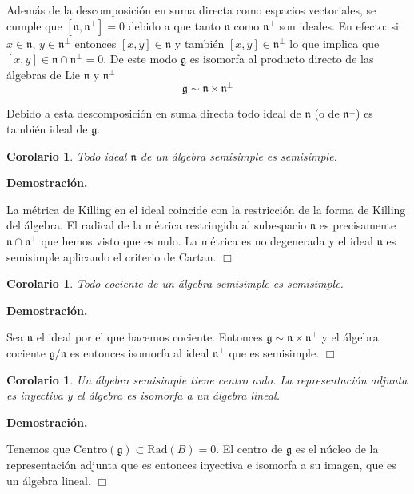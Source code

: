 \documentclass[a4paper,draft,12pt]{article}
\newtheorem{cor}[teo]{Corolario}%
\newcommand{\dem}{\noindent \textbf{Demostración. }\vspace{0.3 cm}}%
\newcommand{\g}{\mathfrak{g}}%
\newcommand{\fin}{ $\Box $ \vspace{0.4 cm}}
\begin{document}
Además de la descomposición en suma directa como espacios vectoriales, se cumple que $[\mathfrak{n},\mathfrak{n}^\perp]=0$ debido a que tanto $\mathfrak{n}$ como $\mathfrak{n}^\perp$ son ideales.  En efecto: si $x  \in \mathfrak{n}$, $y \in \mathfrak{n}^\perp$ entonces $[x,y] \in \mathfrak{n}$ y también $[x,y] \in \mathfrak{n}^\perp$ lo que implica que $[x,y] \in \mathfrak{n}\cap \mathfrak{n}^\perp=0$. De este modo $\g$ es isomorfa al producto directo de las álgebras de Lie $\mathfrak{n}$ y $\mathfrak{n}^\perp$
$$
\g \sim \mathfrak{n} \times \mathfrak{n}^\perp
$$

Debido a esta descomposición en suma directa  todo ideal de $\mathfrak{n}$ (o de $\mathfrak{n}^\perp$)  es también ideal de $\g$.  



\begin{cor}

Todo ideal $ \mathfrak{n}$ de un álgebra semisimple es semisimple.

\end{cor}

\dem

La métrica de Killing en el ideal coincide con la restricción de la forma de Killing del álgebra.  El radical de la métrica restringida al subespacio $\mathfrak{n}$ es precisamente $\mathfrak{n} \cap \mathfrak{n}^\perp$ que hemos visto que es nulo.  La métrica es no degenerada y el ideal $\mathfrak{n}$ es semisimple aplicando el criterio de Cartan.  \fin

\begin{cor}

Todo cociente de un álgebra semisimple es semisimple.

\end{cor}

\dem

Sea $\mathfrak{n}$ el ideal por el que hacemos cociente.  Entonces $\g \sim \mathfrak{n}\times \mathfrak{n}^\perp$ y el álgebra cociente $\g /\mathfrak{n}$ es entonces isomorfa al ideal $\mathfrak{n}^\perp$ que es semisimple. \fin

\begin{cor}

Un álgebra semisimple tiene centro nulo.  La representación adjunta es inyectiva y  el álgebra es isomorfa a un álgebra lineal.

\end{cor}

\dem

Tenemos que $\mathrm{Centro}(\g) \subset \mathrm{Rad}(B)=0$.  El centro de $\g$ es el núcleo de la representación adjunta que es entonces inyectiva e isomorfa a su imagen, que es un álgebra lineal.   \fin
\end{document}
